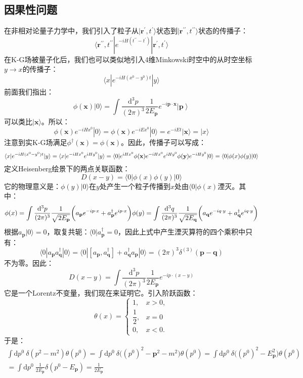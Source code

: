 \documentclass{book}
\begin{document}
\subsection{因果性问题}
在非相对论量子力学中，我们引入了粒子从$|\mathbf{r^{\prime}},t^{\prime}\rangle$状态到$|\mathbf{r^{\prime\prime}},t^{\prime\prime}\rangle$状态的传播子：
$$
\langle \mathbf{r^{\prime\prime}},t^{\prime\prime}|e^{-iH(t^{\prime\prime}-t^\prime)}|\mathbf{r^{\prime}},t^{\prime}\rangle
$$
在K-G场被量子化后，我们也可以类似地引入4维Minkowski时空中的从时空坐标$y\to x$的传播子：
$$
\langle x|e^{-iH(x^0-y^0)t}|y\rangle
$$
前面我们指出：
$$
\phi(\mathbf{x})|0\rangle
=\int\frac{\mathrm{d}^3p}{(2\pi)^3}\frac1{2E_\mathbf{p}}e^{-i\mathbf{p}\cdot\mathbf{x}}\left|\mathbf{p}\right\rangle
$$
可以类比$|\mathbf{x}\rangle$。所以：
$$
\phi(\mathbf{x})e^{-iHx^0}|0\rangle =\phi(\mathbf{x})e^{-iEx^0}|0\rangle=e^{-iEt}|\mathbf{x}\rangle=|x\rangle
$$
注意到实K-G场满足$\phi^\dagger(\mathbf{x})=\phi(\mathbf{x})$。因此，传播子可以写成：
$$
\langle x|e^{-iH(x^0-y^0)t}|y\rangle=\langle x|e^{-iHx^0}e^{iHy^0}|y\rangle=\langle0|e^{iHx^0}\phi(\mathbf{x})e^{-iHx^0}e^{iHy^0}\phi(\mathbf{y})e^{-iHy^0}|0\rangle\\=\langle 0|\phi(x)\phi(y)|0\rangle
$$
定义Heisenberg绘景下的两点关联函数：
$$
D(x-y)=\langle0|\phi(x)\phi(y)|0\rangle
$$
它的物理意义是：$\phi(y)|0\rangle$在$y$处产生一个粒子传播到$x$处由$\langle0|\phi(x)$湮灭。其中：
$$
\phi(x)=\int\frac{\mathrm{d}^3p}{(2\pi)^3}\frac{1}{\sqrt{2E_{\mathbf{p}}}}\biggl(a_{\mathbf{p}}e^{-ip\cdot x}+a_{\mathbf{p}}^{\dagger}e^{ip\cdot x}\biggr) \\
\phi(y)=\int\frac{\mathrm{d}^3q}{(2\pi)^3}\frac{1}{\sqrt{2E_{\mathbf{q}}}}\biggl(a_{\mathbf{q}}e^{-iq\cdot y}+a_{\mathbf{q}}^{\dagger}e^{iq\cdot y}\biggr)
$$
根据$a_\mathbf{p}|0\rangle=0$，取复共轭：$\langle 0|a_{\mathbf{p}}^\dagger=0$，因此上式中产生湮灭算符的四个乘积中只有：
$$
\langle 0|a_\mathbf{p}a_\mathbf{q}^\dagger|0\rangle=\langle 0|[a_\mathbf{p},a_\mathbf{q}^\dagger]+a_\mathbf{q}^\dagger a_\mathbf{p}|0\rangle=(2\pi)^3\delta^{(3)}(\mathbf{p}-\mathbf{q})
$$
不为零。因此：
$$
D(x-y)={\int\frac{\mathrm{d}^3p}{(2\pi)^3}\frac1{2E_{\mathbf{p}}}e^{-ip\cdot(x-y)}}
$$
它是一个Lorentz不变量，我们现在来证明它。引入阶跃函数：
$$
\theta(x)=\begin{cases}1,&x>0,\\[2ex] \dfrac{1}{2},&x=0 \\[2ex]0,&x<0.\end{cases}
$$
于是：
\begin{gather*}
    \int \mathrm{d}p^0\ \delta(p^2-m^2)\theta(p^0)=\int \mathrm{d}p^0\ \delta\Big({(p^0)}^2-\mathbf{p}^2-m^2\Big)\theta(p^0)=\int \mathrm{d}p^0\ \delta\Big({(p^0)}^2-E_\mathbf{p}^2\Big)\theta(p^0) \\=\int\mathrm{d}p^0\ \frac{1}{2E_\mathbf{p}}\delta(p^0-E_\mathbf{p})=\frac{1}{2E_\mathbf{p}}
\end{gather*}
\end{document}

